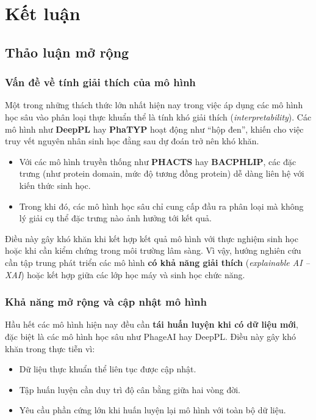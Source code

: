 
\chapter{Kết luận}
\section{Thảo luận mở rộng}

\subsection{Vấn đề về tính giải thích của mô hình}

Một trong những thách thức lớn nhất hiện nay trong việc áp dụng các mô hình học sâu vào phân loại thực khuẩn thể là tính khó giải thích (\textit{interpretability}). Các mô hình như \textbf{DeepPL} hay \textbf{PhaTYP} hoạt động như “hộp đen”, khiến cho việc truy vết nguyên nhân sinh học đằng sau dự đoán trở nên khó khăn.

\begin{itemize}
    \item Với các mô hình truyền thống như \textbf{PHACTS} hay \textbf{BACPHLIP}, các đặc trưng (như protein domain, mức độ tương đồng protein) dễ dàng liên hệ với kiến thức sinh học.
    \item Trong khi đó, các mô hình học sâu chỉ cung cấp đầu ra phân loại mà không lý giải cụ thể đặc trưng nào ảnh hưởng tới kết quả.
\end{itemize}

Điều này gây khó khăn khi kết hợp kết quả mô hình với thực nghiệm sinh học hoặc khi cần kiểm chứng trong môi trường lâm sàng. Vì vậy, hướng nghiên cứu cần tập trung phát triển các mô hình \textbf{có khả năng giải thích} (\textit{explainable AI – XAI}) hoặc kết hợp giữa các lớp học máy và sinh học chức năng.

\subsection{Khả năng mở rộng và cập nhật mô hình}

Hầu hết các mô hình hiện nay đều cần \textbf{tái huấn luyện khi có dữ liệu mới}, đặc biệt là các mô hình học sâu như PhageAI hay DeepPL. Điều này gây khó khăn trong thực tiễn vì:

\begin{itemize}
    \item Dữ liệu thực khuẩn thể liên tục được cập nhật.
    \item Tập huấn luyện cần duy trì độ cân bằng giữa hai vòng đời.
    \item Yêu cầu phần cứng lớn khi huấn luyện lại mô hình với toàn bộ dữ liệu.
\end{itemize}

